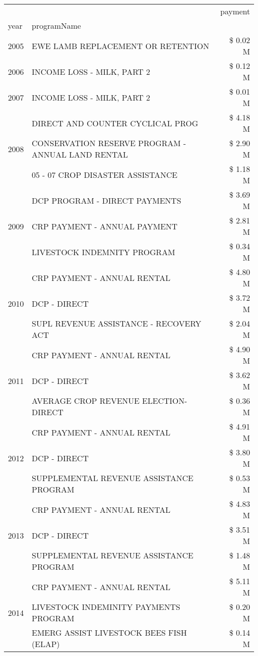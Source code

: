 \begin{tabular}{llr}
\toprule
 &  & payment \\
year & programName &  \\
\midrule
2005 & EWE LAMB REPLACEMENT OR RETENTION & \$ 0.02 M \\
\cline{1-3}
2006 & INCOME LOSS - MILK, PART 2 & \$ 0.12 M \\
\cline{1-3}
2007 & INCOME LOSS - MILK, PART 2 & \$ 0.01 M \\
\cline{1-3}
\multirow[t]{3}{*}{2008} & DIRECT AND COUNTER CYCLICAL PROG & \$ 4.18 M \\
 & CONSERVATION RESERVE PROGRAM - ANNUAL LAND RENTAL & \$ 2.90 M \\
 & 05 - 07 CROP DISASTER ASSISTANCE & \$ 1.18 M \\
\cline{1-3}
\multirow[t]{3}{*}{2009} & DCP PROGRAM - DIRECT PAYMENTS & \$ 3.69 M \\
 & CRP PAYMENT - ANNUAL PAYMENT & \$ 2.81 M \\
 & LIVESTOCK INDEMNITY PROGRAM & \$ 0.34 M \\
\cline{1-3}
\multirow[t]{3}{*}{2010} & CRP PAYMENT - ANNUAL RENTAL & \$ 4.80 M \\
 & DCP - DIRECT & \$ 3.72 M \\
 & SUPL REVENUE ASSISTANCE - RECOVERY ACT & \$ 2.04 M \\
\cline{1-3}
\multirow[t]{3}{*}{2011} & CRP PAYMENT - ANNUAL RENTAL & \$ 4.90 M \\
 & DCP - DIRECT & \$ 3.62 M \\
 & AVERAGE CROP REVENUE ELECTION-DIRECT & \$ 0.36 M \\
\cline{1-3}
\multirow[t]{3}{*}{2012} & CRP PAYMENT - ANNUAL RENTAL & \$ 4.91 M \\
 & DCP - DIRECT & \$ 3.80 M \\
 & SUPPLEMENTAL REVENUE ASSISTANCE PROGRAM & \$ 0.53 M \\
\cline{1-3}
\multirow[t]{3}{*}{2013} & CRP PAYMENT - ANNUAL RENTAL & \$ 4.83 M \\
 & DCP - DIRECT & \$ 3.51 M \\
 & SUPPLEMENTAL REVENUE ASSISTANCE PROGRAM & \$ 1.48 M \\
\cline{1-3}
\multirow[t]{3}{*}{2014} & CRP PAYMENT - ANNUAL RENTAL & \$ 5.11 M \\
 & LIVESTOCK INDEMINITY PAYMENTS PROGRAM & \$ 0.20 M \\
 & EMERG ASSIST LIVESTOCK BEES FISH (ELAP) & \$ 0.14 M \\
\cline{1-3}

\end{tabular}
